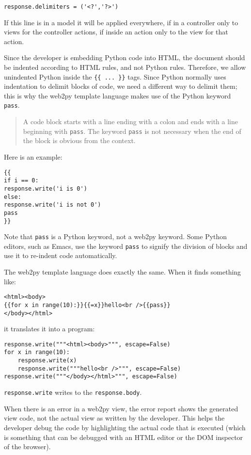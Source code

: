 \documentclass[justified,sixbynine,notoc]{tufte-book}
\def\ft{\small\tt}
\begin{document}
\begin{fullwidth}
\begin{lstlisting}
response.delimiters = ('<?','?>')
\end{lstlisting}

If this line is in a model it will be applied everywhere, if in a controller only to views for the controller actions, if inside an action only to the view for that action.

Since the developer is embedding Python code into HTML, the document should be indented according to HTML rules, and not Python rules. Therefore, we allow unindented Python inside the {\ft \{\{ ... \}\}} tags. Since Python normally uses indentation to delimit blocks of code, we need a different way to delimit them; this is why the web2py template language makes use of the Python keyword {\ft pass}.

\begin{quote}A code block starts with a line ending with a colon and ends with a line beginning with {\ft pass}. The keyword {\ft pass} is not necessary when the end of the block is obvious from the context.\end{quote}
Here is an example:

\begin{lstlisting}[keywords={}]
{{
if i == 0:
response.write('i is 0')
else:
response.write('i is not 0')
pass
}}
\end{lstlisting}

Note that {\ft pass} is a Python keyword, not a web2py keyword. Some Python editors, such as Emacs, use the keyword {\ft pass} to signify the division of blocks and use it to re-indent code automatically.

The web2py template language does exactly the same. When it finds something like:

\begin{lstlisting}[keywords={}]
<html><body>
{{for x in range(10):}}{{=x}}hello<br />{{pass}}
</body></html>
\end{lstlisting}
\noindent it translates it into a program:
\begin{lstlisting}
response.write("""<html><body>""", escape=False)
for x in range(10):
    response.write(x)
    response.write("""hello<br />""", escape=False)
response.write("""</body></html>""", escape=False)
\end{lstlisting}
{\ft response.write} writes to the {\ft response.body}.

When there is an error in a web2py view, the error report shows the generated view code, not the actual view as written by the developer. This helps the developer debug the code by highlighting the actual code that is executed (which is something that can be debugged with an HTML editor or the DOM inspector of the browser).


\end{fullwidth}
\end{document}
